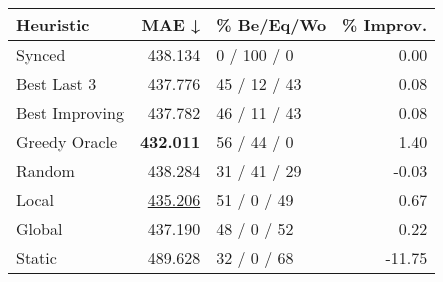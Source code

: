\begin{tabular}{lrlr}
\toprule
\textbf{Heuristic} & \textbf{MAE ↓} & \textbf{\% Be/Eq/Wo} & \textbf{\% Improv.} \\
\midrule
            Synced &        438.134 &          0 / 100 / 0 &                0.00 \\
\midrule
       Best Last 3 &        437.776 &         45 / 12 / 43 &                0.08 \\
    Best Improving &        437.782 &         46 / 11 / 43 &                0.08 \\
\addlinespace
     Greedy Oracle &        \textbf{432.011} &          56 / 44 / 0 &                1.40 \\
            Random &        438.284 &         31 / 41 / 29 &               -0.03 \\
\midrule
             Local &        \underline{435.206} &          51 / 0 / 49 &                0.67 \\
            Global &        437.190 &          48 / 0 / 52 &                0.22 \\
\midrule
            Static &        489.628 &          32 / 0 / 68 &              -11.75 \\
\bottomrule
\end{tabular}

\label{tab:non_lr05_le1_bs2_Summary}
